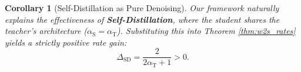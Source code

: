 \documentclass{article}
\theoremstyle{definition}
\theoremstyle{definition}
\theoremstyle{plain}
\newtheorem{theorem}{Theorem}
\theoremstyle{plain}
\theoremstyle{plain}
\theoremstyle{plain}
\newtheorem{corollary}{Corollary}
\theoremstyle{plain}
\newcommand{\te}{\mathrm{T}}
\newcommand{\st}{\mathrm{S}}
\begin{document}

\begin{corollary}[Self-Distillation as Pure Denoising]
\label{cor:self_distillation}
    Our framework naturally explains the effectiveness of \textbf{Self-Distillation}, where the student shares the teacher's architecture ($\alpha_\st = \alpha_\te$).
    Substituting this into Theorem \ref{thm:w2s_rates} yields a strictly positive rate gain:
    \begin{equation}
        \Delta_{\mathrm{SD}} = \frac{2}{2\alpha_\te+1} > 0.
    \end{equation}
\end{corollary}



\end{document}
